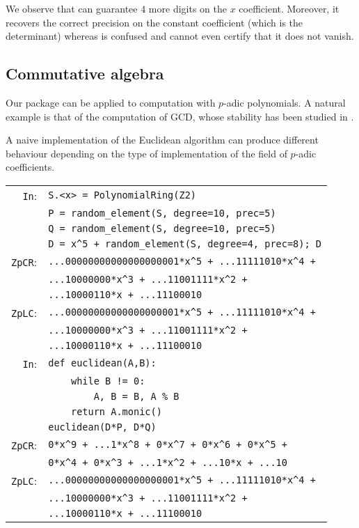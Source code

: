 \documentclass[sigconf]{acmart}
\newcommand{\ZpCR}{\text{\color{output} \rm \tt ZpCR}\xspace}
\newcommand{\ZpLC}{\text{\color{output} \rm \tt ZpLC}\xspace}
\newcommand{\cIn}{{\color{input} \tt \phantom{Zp}In}:}
\newcommand{\cZpCR}{{\color{output} \tt ZpCR}:}
\newcommand{\cZpLC}{{\color{output} \tt ZpLC}:}
\theoremstyle{definition}
\begin{document}
\smallskip

\noindent
We observe that \ZpLC can guarantee $4$ more digits on the $x$ 
coefficient. Moreover, it recovers the correct precision on the
constant coefficient (which is the determinant) whereas \ZpCR is 
confused and cannot even certify that it does not vanish.

\subsection{Commutative algebra}

Our package can be applied to computation with $p$-adic polynomials. A 
natural example is that of the computation of GCD, whose stability has 
been studied in \cite{caruso:2017}.

A naive implementation of the Euclidean algorithm
can produce different behaviour depending 
on the type of implementation of the field
of $p$-adic coefficients.

\smallskip

{\noindent \small
\begin{tabular}{@{}rl}
\cIn
 & \verb?S.<x> = ?{\color{constructor}\verb?PolynomialRing?}\verb?(?{\color{ring}\verb?Z2?}\verb?)? \\
 & \verb?P = ?{\color{function}\verb?random_element?}\verb?(S, degree=10, prec=5)? \\
 & \verb?Q = ?{\color{function}\verb?random_element?}\verb?(S, degree=10, prec=5)? \\
 & \verb?D = x^5 + ?{\color{function}\verb?random_element?}\verb?(S, degree=4, prec=8); D? \\
\cZpCR
 & \verb?...00000000000000000001*x^5 + ...11111010*x^4 +? \\ 
 & \verb?...10000000*x^3 + ...11001111*x^2 +? \\
 & \verb?...10000110*x + ...11100010? \\
\cZpLC
 & \verb?...00000000000000000001*x^5 + ...11111010*x^4 +? \\ 
 & \verb?...10000000*x^3 + ...11001111*x^2 +? \\
 & \verb?...10000110*x + ...11100010? \\
\cIn
 & {\color{keyword}\verb?def?}\verb? ?{\color{function}\verb?euclidean?}\verb?(A,B):? \\
 & \verb?    ?{\color{keyword}\verb?while?}\verb? B != 0:? \\
 & \verb?        A, B = B, A % B? \\
 & \verb?    ?{\color{keyword}\verb?return?}\verb? A.monic()? \\
 & {\color{function}\verb?euclidean?}\verb?(D*P, D*Q)? \\
\cZpCR
 & \verb?0*x^9 + ...1*x^8 + 0*x^7 + 0*x^6 + 0*x^5 +? \\
 & \verb?0*x^4 + 0*x^3 + ...1*x^2 + ...10*x + ...10? \\
\cZpLC
 & \verb?...00000000000000000001*x^5 + ...11111010*x^4 +? \\ 
 & \verb?...10000000*x^3 + ...11001111*x^2 +? \\
 & \verb?...10000110*x + ...11100010? \\
\end{tabular}}
\end{document}
